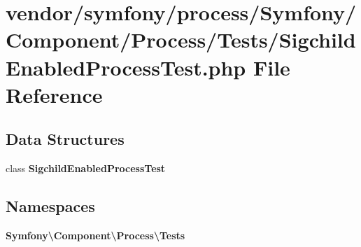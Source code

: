 \section{vendor/symfony/process/\+Symfony/\+Component/\+Process/\+Tests/\+Sigchild\+Enabled\+Process\+Test.php File Reference}
\label{_sigchild_enabled_process_test_8php}
\subsection*{Data Structures}
\begin{DoxyCompactItemize}
\item 
class {\bf Sigchild\+Enabled\+Process\+Test}
\end{DoxyCompactItemize}
\subsection*{Namespaces}
\begin{DoxyCompactItemize}
\item 
 {\bf Symfony\textbackslash{}\+Component\textbackslash{}\+Process\textbackslash{}\+Tests}
\end{DoxyCompactItemize}
